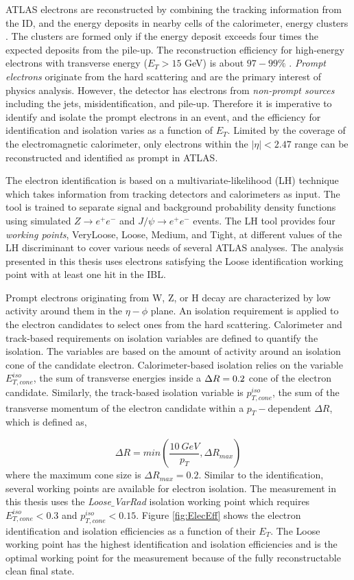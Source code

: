 ATLAS electrons are reconstructed by combining the tracking information from the ID, and the energy deposits in nearby cells of the calorimeter,  energy clusters \cite{ElectronReco}. The clusters are formed only if the energy deposit exceeds four times the expected deposits from the pile-up. The reconstruction efficiency for high-energy electrons with transverse energy ($E_{T}>15$ GeV) is about $97-99\%$ \cite{ElectronReco}. \textit{Prompt electrons} originate from the hard scattering and are the primary interest of physics analysis. However, the detector has electrons from \textit{non-prompt sources} including the jets, misidentification, and pile-up. Therefore it is imperative to identify and isolate the prompt electrons in an event, and the efficiency for identification and isolation varies as a function of $E_{T}$. Limited by the coverage of the electromagnetic calorimeter, only electrons within the $|\eta| <2.47$ range can be reconstructed and identified as prompt in ATLAS.

The electron identification is based on a multivariate-likelihood (LH) technique which takes information from tracking detectors and calorimeters as input. The tool is trained to separate signal and background probability density functions using simulated $Z \rightarrow e^{+}e^{-}$ and $J / \psi \rightarrow e^{+}e^{-}$ events. The LH tool provides four \textit{working points}, VeryLoose, Loose, Medium, and Tight, at different values of the LH discriminant to cover various needs of several ATLAS analyses. The analysis presented in this thesis uses electrons satisfying the Loose identification working point with at least one hit in the IBL. 

Prompt electrons originating from W, Z, or H decay are characterized by low activity around them in the $\eta-\phi$ plane. An isolation requirement is applied to the electron candidates to select ones from the hard scattering. Calorimeter and track-based requirements on isolation variables are defined to quantify the isolation. The variables are based on the amount of activity around an isolation cone of the candidate electron. Calorimeter-based isolation relies on the variable $E_{T,cone}^{iso}$, the sum of transverse energies inside a $\Delta R=0.2$ cone of the electron candidate. Similarly, the track-based isolation variable is $p_{T,cone}^{iso}$, the sum of the transverse momentum of the electron candidate within a $p_{T}-$dependent $\Delta R$, which is defined as, 

\begin{equation}
\Delta R = min \left( \frac{10 ~ GeV}{p_{T}},\Delta R_{max} \right)
\end{equation}
where the maximum cone size is $\Delta R_{max} = 0.2$. Similar to the identification, several working points are available for electron isolation. The measurement in this thesis uses the \textit{Loose$\_$VarRad} isolation working point which requires $E_{T,cone}^{iso} < 0.3$ and $p_{T,cone}^{iso} < 0.15$. Figure \ref{fig:ElecEff} shows the electron identification and isolation efficiencies as a function of their $E_{T}$. The Loose working point has the highest identification and isolation efficiencies and is the optimal working point for the measurement because of the fully reconstructable clean final state.

